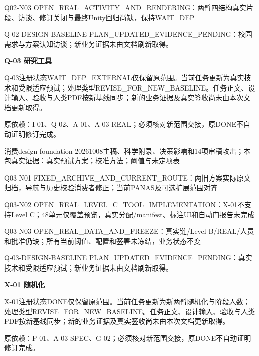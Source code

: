 \documentclass[11pt,a4paper]{article}
\newcommand{\reviewsection}[1]{\par\Needspace{5\baselineskip}\vspace{10pt}\begin{center}{\titlelatin\titlecjk\bfseries\fontsize{14}{20}\selectfont #1}\end{center}}
\begin{document}
Q02-\allowbreak{}N03 OPEN\_\allowbreak{}REAL\_\allowbreak{}ACTIVITY\_\allowbreak{}AND\_\allowbreak{}RENDERING：两臂四结构真实片段、访谈、修订关闭与最终Unity回归尚缺，保持WAIT\_\allowbreak{}DEP


Q-\allowbreak{}02-\allowbreak{}DESIGN-\allowbreak{}BASELINE PLAN\_\allowbreak{}UPDATED\_\allowbreak{}EVIDENCE\_\allowbreak{}PENDING：校园需求与方案认知访谈；新业务证据未由文档刷新取得。


\reviewsection{Q-\allowbreak{}03 研究工具}
Q-\allowbreak{}03注册状态WAIT\_\allowbreak{}DEP\_\allowbreak{}EXTERNAL仅保留原范围。当前任务更新为真实技术和受限适应预试；处理类型REVISE\_\allowbreak{}FOR\_\allowbreak{}NEW\_\allowbreak{}BASELINE。任务正文、设计输入、验收与人类PDF按新基线同步；新的业务证据及真实签收尚未由本次文档更新取得。


原依赖：I-\allowbreak{}01、Q-\allowbreak{}02、A-\allowbreak{}01、A-\allowbreak{}03-\allowbreak{}REAL；必须核对新范围交接，原DONE不自动证明修订完成。


消费design-\allowbreak{}foundation-\allowbreak{}20261008主稿、科学附录、决策影响和14项审稿攻击；本包真实证据：真实预试方案；校准方法；阈值与未定项表


Q03-\allowbreak{}N01 FIXED\_\allowbreak{}ARCHIVE\_\allowbreak{}AND\_\allowbreak{}CURRENT\_\allowbreak{}ROUTE：两旧方案实际原文归档，导航与历史校验消费者修正；当前PANAS及可选扩展范围对齐


Q03-\allowbreak{}N02 OPEN\_\allowbreak{}REAL\_\allowbreak{}LEVEL\_\allowbreak{}C\_\allowbreak{}TOOL\_\allowbreak{}IMPLEMENTATION：X-\allowbreak{}01不支持Level C；48单元仅覆盖预览，真实分配/\allowbreak{}manifest、标注UI和自动门报告未完成


Q03-\allowbreak{}N03 OPEN\_\allowbreak{}REAL\_\allowbreak{}DATA\_\allowbreak{}AND\_\allowbreak{}FREEZE：真实链/\allowbreak{}Level B/\allowbreak{}REAL/\allowbreak{}人员和批准仍缺；所有当前阈值、配置和签署未冻结，业务状态不变


Q-\allowbreak{}03-\allowbreak{}DESIGN-\allowbreak{}BASELINE PLAN\_\allowbreak{}UPDATED\_\allowbreak{}EVIDENCE\_\allowbreak{}PENDING：真实技术和受限适应预试；新业务证据未由文档刷新取得。


\reviewsection{X-\allowbreak{}01 随机化}
X-\allowbreak{}01注册状态DONE仅保留原范围。当前任务更新为新两臂随机化与阶段人数；处理类型REVISE\_\allowbreak{}FOR\_\allowbreak{}NEW\_\allowbreak{}BASELINE。任务正文、设计输入、验收与人类PDF按新基线同步；新的业务证据及真实签收尚未由本次文档更新取得。


原依赖：P-\allowbreak{}01、A-\allowbreak{}03-\allowbreak{}SPEC、G-\allowbreak{}02；必须核对新范围交接，原DONE不自动证明修订完成。
\end{document}
